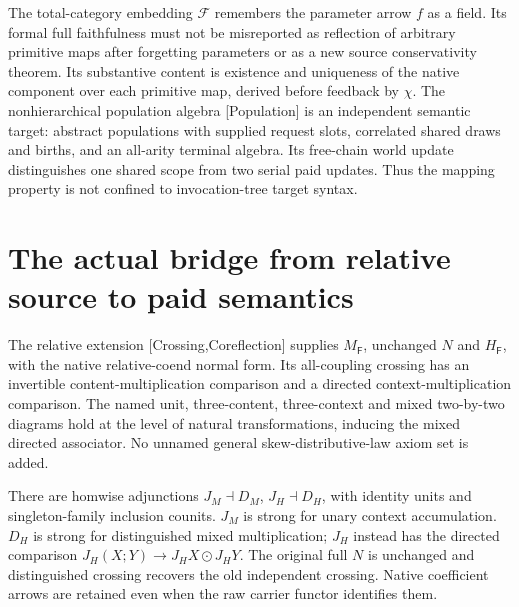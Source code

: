 \documentclass[11pt]{article}
\begin{document}
The total-category embedding $\mathcal F$ remembers the parameter arrow $f$ as a field. Its formal full faithfulness must not be misreported as reflection of arbitrary primitive maps after forgetting parameters or as a new source conservativity theorem. Its substantive content is existence and uniqueness of the native component over each primitive map, derived before feedback by $\chi$. The nonhierarchical population algebra [Population] is an independent semantic target: abstract populations with supplied request slots, correlated shared draws and births, and an all-arity terminal algebra. Its free-chain world update distinguishes one shared scope from two serial paid updates. Thus the mapping property is not confined to invocation-tree target syntax.

\section{The actual bridge from relative source to paid semantics}
The relative extension [Crossing,Coreflection] supplies $M_{\mathsf F}$, unchanged $N$ and $H_{\mathsf F}$, with the native relative-coend normal form. Its all-coupling crossing has an invertible content-multiplication comparison and a directed context-multiplication comparison. The named unit, three-content, three-context and mixed two-by-two diagrams hold at the level of natural transformations, inducing the mixed directed associator. No unnamed general skew-distributive-law axiom set is added.

There are homwise adjunctions $J_M\dashv D_M$, $J_H\dashv D_H$, with identity units and singleton-family inclusion counits. $J_M$ is strong for unary context accumulation. $D_H$ is strong for distinguished mixed multiplication; $J_H$ instead has the directed comparison
$J_H(X;Y)\to J_HX\odot J_HY$. The original full $N$ is unchanged and distinguished crossing recovers the old independent crossing. Native coefficient arrows are retained even when the raw carrier functor identifies them.
\end{document}
